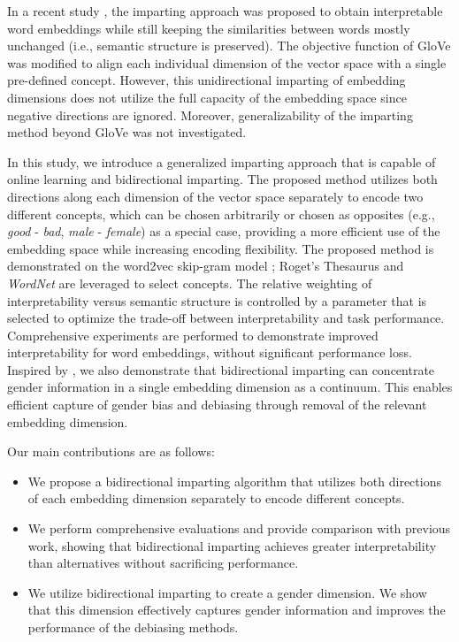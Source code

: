 \documentclass[11pt,a4paper]{article}
\begin{document}
In a recent study  \citep{senel20impart}, the imparting approach was proposed to obtain
interpretable word embeddings while still keeping
the similarities between words mostly unchanged (i.e., semantic structure is preserved). The
objective function of GloVe 
\citep{pennington14glove} was modified to align each
individual dimension of the vector space with a single
pre-defined concept. However, this unidirectional imparting
of embedding dimensions does not utilize the full capacity
of the embedding space since negative directions are
ignored. Moreover, generalizability of the imparting method
beyond GloVe  was not
investigated. 

In this study, we introduce a generalized imparting approach that is capable of online learning and bidirectional imparting. 
The proposed method utilizes both directions along each dimension of the vector space separately to encode two different concepts, which can be chosen arbitrarily or chosen as opposites (e.g., \textit{good} - \textit{bad}, \textit{male} - \textit{female}) as a special case, providing a more efficient use of the embedding space while increasing encoding flexibility. 
The proposed method is demonstrated on the word2vec skip-gram model \citep{mikolov13word2vec_a,mikolov13word2vec_b}; Roget's Thesaurus and \textit{WordNet} are leveraged to select concepts. 
The relative weighting of interpretability versus semantic structure is controlled by a parameter that is selected to optimize the trade-off between interpretability and task performance. 
Comprehensive experiments are performed to demonstrate improved interpretability for word embeddings, without significant performance loss. 
Inspired by  \citet{bolukbasi16debiasing}, we also demonstrate that bidirectional imparting can concentrate gender information in a single embedding dimension as a continuum. 
This enables efficient capture of gender bias and debiasing through removal of the relevant embedding dimension. 

Our main contributions are as follows:
\begin{itemize}
    \item We propose a bidirectional imparting algorithm that utilizes both directions of each embedding dimension separately to encode different concepts.
    
    \item We perform comprehensive evaluations and provide comparison with  previous work, showing that bidirectional imparting achieves greater interpretability than alternatives without sacrificing performance. 
    
    \item We utilize bidirectional imparting to create a gender dimension. We show that this dimension effectively captures gender information and improves the performance of the debiasing methods.
\end{itemize}
\end{document}
